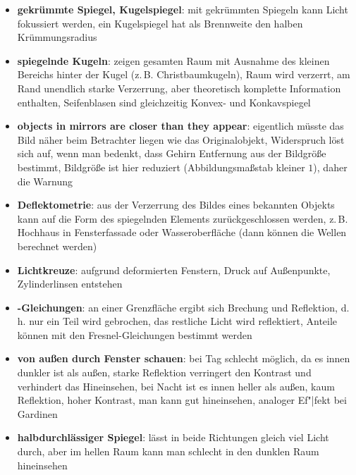 \begin{itemize}
    \item
    \textbf{gekrümmte Spiegel, Kugelspiegel}:
    mit gekrümmten Spiegeln kann Licht fokussiert werden,
    ein Kugelspiegel hat als Brennweite den halben Krümmungsradius

    \item
    \textbf{spiegelnde Kugeln}:
    zeigen gesamten Raum mit Ausnahme des kleinen Bereichs hinter der Kugel
    (z.\,B. Christbaumkugeln), Raum wird verzerrt, am Rand unendlich starke
    Verzerrung, aber theoretisch komplette Information enthalten,
    Seifenblasen sind gleichzeitig Konvex- und Konkavspiegel

    \item
    \textbf{objects in mirrors are closer than they appear}:
    eigentlich müsste das Bild näher beim Betrachter liegen wie das
    Originalobjekt, Widerspruch löst sich auf, wenn man bedenkt, dass Gehirn
    Entfernung aus der Bildgröße bestimmt, Bildgröße ist hier reduziert
    (Abbildungsmaßstab kleiner $1$), daher die Warnung

    \item
    \textbf{Deflektometrie}:
    aus der Verzerrung des Bildes eines bekannten Objekts kann auf die Form
    des spiegelnden Elements zurückgeschlossen werden, z.\,B.
    Hochhaus in Fensterfassade oder Wasseroberfläche
    (dann können die Wellen berechnet werden)

    \item
    \textbf{Lichtkreuze}:
    aufgrund deformierten Fenstern, Druck auf Außenpunkte,
    Zylinderlinsen entstehen
\end{itemize}
\linie
\begin{itemize}
    \item
    \textbf{-Gleichungen}:
    an einer Grenzfläche ergibt sich Brechung und Reflektion,
    d.\,h. nur ein Teil wird gebrochen, das restliche Licht wird reflektiert,
    Anteile können mit den Fresnel-Gleichungen bestimmt werden

    \item
    \textbf{von außen durch Fenster schauen}:
    bei Tag schlecht möglich, da es innen dunkler ist als außen,
    starke Reflektion verringert den Kontrast und verhindert das Hineinsehen,
    bei Nacht ist es innen heller als außen, kaum Reflektion, hoher Kontrast,
    man kann gut hineinsehen,
    analoger Ef"|fekt bei Gardinen

    \item
    \textbf{halbdurchlässiger Spiegel}:
    lässt in beide Richtungen gleich viel Licht durch, aber im hellen Raum
    kann man schlecht in den dunklen Raum hineinsehen
\end{itemize}
